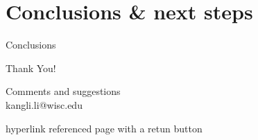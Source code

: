 \documentclass[notes,11pt, aspectratio=169]{beamer}
\begin{document}
\section{Conclusions \& next steps}

\begin{frame}{Conclusions}
\end{frame}

\begin{frame}
\centering
\Large{Thank You!} 
\vspace{2em}

\large{Comments and suggestions \\ kangli.li@wisc.edu}
\end{frame} %

\begin{frame}
\end{frame} %



\appendix 

\begin{frame}[label=subprime_match]{hyperlink referenced page with a retun button}
\hfill \hyperlink{robustness_check_subprime}{}
\end{frame}
\end{document}
